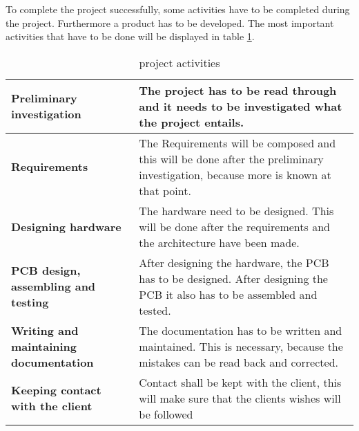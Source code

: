 To complete the project successfully, some activities have to be completed during the project. Furthermore a product has to be developed. The most important activities that have to be done will be displayed in table \ref{tab:project_activiteiten}.

\begin{table}[H]
    \centering
    \begin{tabular}{p{8cm} | p{9cm}}
        \textbf{Preliminary investigation} & The project has to be read through and it needs to be investigated what the project entails.\\\hline
        \textbf{Requirements} & The Requirements will be composed and this will be done after the preliminary investigation, because more is known at that point.\\\hline
        \textbf{Designing hardware} & The hardware need to be designed. This will be done after the requirements and the architecture have been made.\\\hline
        \textbf{PCB design, assembling and testing} & After designing the hardware, the PCB has to be designed. After designing the PCB it also has to be assembled and tested.\\\hline
        \textbf{Writing and maintaining documentation} & The documentation has to be written and maintained. This is necessary, because the mistakes can be read back and corrected.\\\hline
        \textbf{Keeping contact with the client} & Contact shall be kept with the client, this will make sure that the clients wishes will be followed\\
    \end{tabular}
    \caption{project activities}
    \label{tab:project_activiteiten}
\end{table}